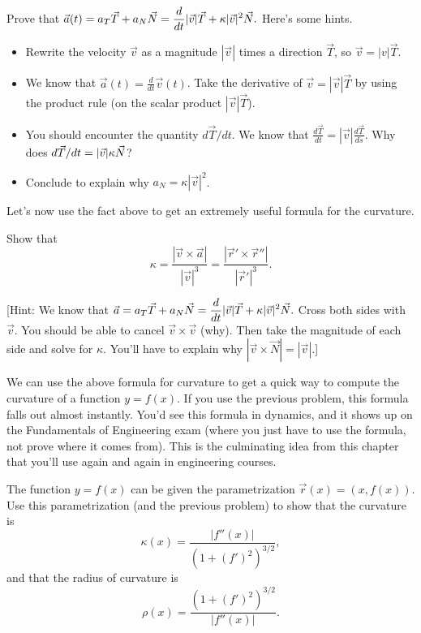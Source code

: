 \begin{problem}%
 Prove that $\displaystyle \vec a(t) = a_T\vec T+a_N\vec N=\frac{d}{dt}|\vec v| \vec T + \kappa |\vec v|^2 \vec N.$ Here's some hints.
\begin{itemize}
 \item Rewrite the velocity $\vec v$ as a magnitude $|\vec v|$ times a direction $\vec T$, so $\vec v = |v|\vec T$.  
 \item We know that $\vec a(t) = \frac{d}{dt}\vec v(t)$. Take the derivative of $\vec v = |\vec v|\vec T$ by using the product rule (on the scalar product $|\vec v|\vec T$).
 \item You should encounter the quantity $d\vec T/dt$. We know that $\frac{d\vec T}{dt} = |\vec v|\frac{d\vec T}{ds}$. Why does $\displaystyle d\vec T/dt=|\vec v|\kappa\vec N$?
 \item Conclude to explain why $a_N =\kappa |\vec v|^2$.
\end{itemize}
\end{problem}

Let's now use the fact above to get an extremely useful formula for the curvature. 

\begin{problem*}[Optional]
Show that $$\kappa = \frac{|\vec v\times \vec a|}{|\vec v|^3} = \frac{|\vec r'\times \vec r''|}{|\vec r'|^3}.$$

[Hint: We know that $\displaystyle \vec a = a_T\vec T+a_N\vec N=\frac{d}{dt}|\vec v| \vec T + \kappa |\vec v|^2 \vec N.$  
Cross both sides with $\vec v$. You should be able to cancel $\vec v\times \vec v$ (why). Then take the magnitude of each side and solve for $\kappa$. You'll have to explain why $|\vec v\times \vec N| = |\vec v|$.]
\end{problem*}

We can use the above formula for curvature to get a quick way to compute the curvature of a function $y=f(x)$. If you use the previous problem, this formula falls out almost instantly. You'd see this formula in dynamics, and it shows up on the Fundamentals of Engineering exam (where you just have to use the formula, not prove where it comes from). This is the culminating idea from this chapter that you'll use again and again in engineering courses.

\begin{problem*}[Optional]\label{formula for curvature}
%
 The function $y=f(x)$ can be given the parametrization  $\vec r(x) = (x,f(x))$.  Use this parametrization (and the previous problem) to show that the curvature is 
$$\kappa(x) = \frac{|f''(x)|}{(1+(f')^2)^{3/2}},$$ 
and that the radius of curvature is
$$\rho(x) = \frac{(1+(f')^2)^{3/2}}{|f''(x)|}.$$ 
\end{problem*}





